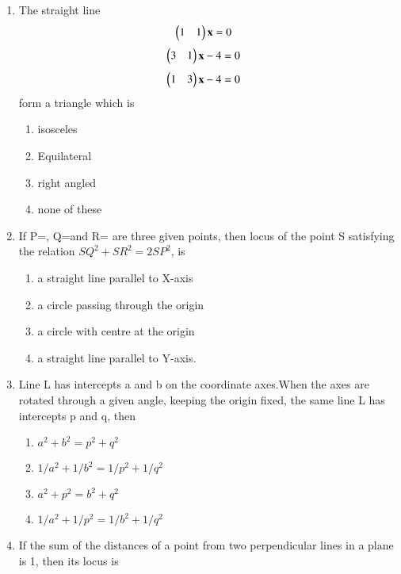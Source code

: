 \begin{enumerate}
\begin{enumerate}
     \item  {}
    \end{enumerate}
\item The straight line \begin{align} 
    \begin{pmatrix}1 & 1\end{pmatrix}\mathbf{x} &= 0
    \end{align} \begin{align} 
    \begin{pmatrix}3 & 1\end{pmatrix}\mathbf{x} - 4 &= 0
    \end{align}\begin{align} 
    \begin{pmatrix}1 & 3\end{pmatrix}\mathbf{x} - 4 &= 0
    \end{align}form a triangle which is
    \begin{enumerate}
     \item isosceles
     \item Equilateral
     \item right angled
     \item none of these
     \end{enumerate}
    \item If P=, Q=and R= are three given points, then locus of the point S satisfying the relation $SQ^2+SR^2=2SP^2$, is
    \begin{enumerate}
     \item  a straight line parallel to X-axis
     \item a circle passing through the origin
     \item a circle with centre at the origin
     \item  a straight line parallel to Y-axis.
     \end{enumerate}
    \item Line L has intercepts a and b on the coordinate axes.When the axes are rotated through a given angle, keeping the origin fixed, the same line L has intercepts p and q, then
    \begin{enumerate}
     \item  $a^2+b^2=p^2+q^2$
     \item  $1/a^2+1/b^2=1/p^2+1/q^2$
     \item  $a^2+p^2=b^2+q^2$
     \item  $1/a^2+1/p^2=1/b^2+1/q^2$
     \end{enumerate}
    \item If the sum of the distances of a point from two perpendicular lines in a plane is 1, then its locus is

\end{enumerate}

